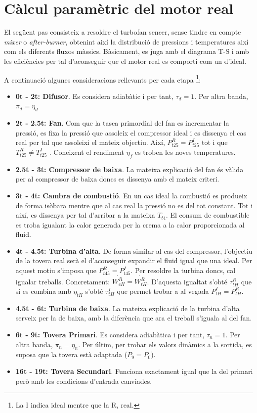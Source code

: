 \section{Càlcul paramètric del motor real}
El següent pas consisteix a resoldre el turbofan sencer, sense tindre en compte \textit{mixer} o \textit{after-burner}, obtenint així la distribució de pressions i temperatures així com els diferents fluxos màssics. Bàsicament, es juga amb el diagrama T-S i amb les eficiències per tal d'aconseguir que el motor real es comporti com un d'ideal.

A continuació algunes consideracions rellevants per cada etapa \footnote{La I indica ideal mentre que la R, real.}:
\begin{itemize}
\item \textbf{0t - 2t: Difusor}. Es considera adiabàtic i per tant, $\tau_d = 1$. Per altra banda, $\pi_d = \eta_d$
\item \textbf{2t - 2.5t: Fan}. Com que la tasca primordial del fan es incrementar la pressió, es fixa la pressió que assoleix el compressor ideal i es dissenya el cas real per tal que assoleixi el mateix objectiu. Així, $P_{t25}^R = P_{t25}^I$ tot i que $T_{t25}^R \neq T_{t25}^I$ . Coneixent el rendiment $\eta_f$ es troben les noves temperatures.
\item \textbf{2.5t - 3t: Compressor de baixa}. La mateixa explicació del fan és vàlida per al compressor de baixa doncs es dissenya amb el mateix criteri.
\item \textbf{3t - 4t: Cambra de combustió}. En un cas ideal la combustió es produeix de forma isòbara mentre que al cas real la pressió no es del tot constant. Tot i així, es dissenya per tal d'arribar a la mateixa $T_{t4}$. El consum de combustible es troba igualant la calor generada per la crema a la calor proporcionada al fluid.
\item \textbf{4t - 4.5t: Turbina d'alta}. De forma similar al cas del compressor, l'objectiu de la tovera real serà el d'aconseguir expandir el fluid igual que una ideal. Per aquest motiu s'imposa que $P_{t45}^R = P_{t45}^I$.  Per resoldre la turbina doncs, cal igualar treballs. Concretament: $\dot{W_{cH}^R} = \dot{W_{tH}^R} $. D'aquesta igualtat s'obté $\tau_{tH}^R$ que si es combina amb $\eta_{tH}$ s'obté $\tau_{tH}^I$ que permet trobar a al vegada $P_{tH}^{I} = P_{tH}^{R}$.
\item \textbf{4.5t - 6t: Turbina de baixa}. La mateixa explicació de la turbina d'alta serveix per la de baixa, amb la diferència que ara el treball s'iguala al del fan.
\item \textbf{6t - 9t: Tovera Primari}. Es considera adiabàtica i per tant, $\tau_n = 1$. Per altra banda, $\pi_n = \eta_n$. Per últim, per trobar els valors dinàmics a la sortida, es suposa que la tovera està adaptada ($P_9 = P_0$).
\item \textbf{16t - 19t: Tovera Secundari}. Funciona exactament igual que la del primari però amb les condicions d'entrada canviades.
\end{itemize}
